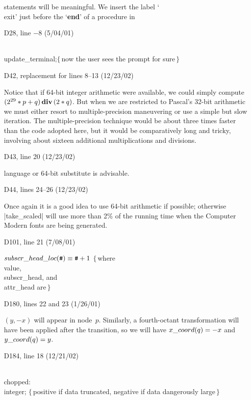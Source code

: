 {\tenpoint\noindent
statements will be meaningful. We insert the label
`\\{exit}' just before the `{\bf end}' of a procedure in\cutpar

\bugonpage D28, line $-8$ (5/04/01)

\ninepoint\noindent
{} \\{update\_terminal};\quad$\{\,$now the user sees
 the prompt for sure$\,\}$

\bugonpage D42, replacement for lines 8--13 (12/23/02)

\tenpoint\noindent\quad
Notice that if 64-bit integer arithmetic were available,
we could simply compute $(2^{29}*p+\nobreak q)\allowbreak\,
\hbox{\bf div}\,(2*q)$.
But when we are restricted to Pascal's 32-bit arithmetic we
must either resort to multiple-precision maneuvering
or use a simple but slow iteration. The multiple-precision technique
would be about three times faster than the code adopted here, but it
would be comparatively long and tricky, involving about sixteen
additional multiplications and divisions.

\bugonpage D43, line 20 (12/23/02)

\tenpoint\noindent
language or 64-bit substitute is advisable.

\bugonpage D44, lines 24--26 (12/23/02)

\tenpoint\noindent\quad
Once again it is a good idea to use 64-bit arithmetic if
possible; otherwise |take_scaled| will use more than 2\% of the running time
when the Computer Modern fonts are being generated.

\bugonpage D101, line 21 (7/08/01)

\ninepoint\noindent
{} $\\{subscr\_head\_loc}(\hbox{\tt\#})\equiv\hbox{\tt\#}+1$
\quad$\{\,$where \\{value}, \\{subscr\_head}, and \\{attr\_head} are$\,\}$

\bugonpage D180, lines 22 and 23 (1/26/01)

\tenpoint\noindent
$(y,-x)$ will appear in node~$p$. Similarly, a fourth-octant
transformation will have been applied after the transition, so
we will have $\\{x\_coord}(q)=\hbox{$-x$}$ and $\\{y\_coord}(q)=y$.

\bugonpage D184, line 18 (12/21/02)

\ninepoint\noindent
\qquad\\{chopped}: \\{integer};\quad
$\{\,$positive if data truncated, negative if data dangerously large$\,\}$

}
